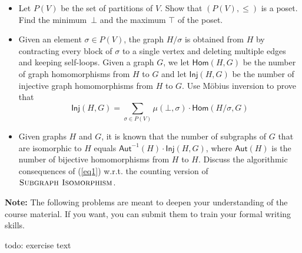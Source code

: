 \documentclass{uebung_cs}
\begin{document}
\begin{exercise}
\begin{enumerate}
\begin{itemize}
\item Let $P(V)$ be the set of partitions of $V$. Show that $(P(V),\leq)$ is a poset. Find the minimum~$\bot$ and the maximum $\top$ of the poset.
\item Given an element $\sigma \in P(V)$, the graph $H/\sigma$ is obtained from $H$ by contracting every block of $\sigma$ to a single vertex and deleting multiple edges and keeping self-loops. Given a graph $G$, we let $\mathsf{Hom}(H,G)$ be the number of graph homomorphisms from $H$ to $G$ and let $\mathsf{Inj}(H,G)$ be the number of injective graph homomorphisms from $H$ to $G$. Use Möbius inversion to prove that 
\begin{equation}\label{eq1}
\mathsf{Inj}(H,G) = \sum_{\sigma \in P(V)} \mu(\bot,\sigma)\cdot \mathsf{Hom}(H/\sigma,G) 
\end{equation}
\item Given graphs $H$ and $G$, it is known that the number of subgraphs of $G$ that are isomorphic to $H$ equals $\mathsf{Aut}^{-1}(H)\cdot \mathsf{Inj}(H,G)$, where $\mathsf{Aut}(H)$ is the number of bijective homomorphisms from $H$ to $H$. Discuss the algorithmic consequences of (\ref{eq1}) w.r.t. the counting version of $\textsc{Subgraph Isomorphism}$.
\end{itemize}
\end{enumerate}
\end{exercise}


\newpage
\textbf{Note:} The following problems are meant to deepen your understanding of the course material. If you want, you can submit them to train your formal writing skills.

\begin{exercise}
  todo: exercise text
\end{exercise}
\end{document}
